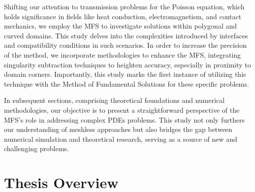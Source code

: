 Shifting our attention to transmission problems for the Poisson equation, which holds significance in fields like heat conduction, electromagnetism, and contact mechanics, we employ the \ac{MFS} to investigate solutions within polygonal and curved domains. This study delves into the complexities introduced by interfaces and compatibility conditions in such scenarios. In order to increase the precision of the method, we incorporate methodologies to enhance the \ac{MFS}, integrating singularity subtraction techniques to heighten accuracy, especially in proximity to domain corners. Importantly, this study marks the first instance of utilizing this technique with the Method of Fundamental Solutions for these specific problems.

In subsequent sections, comprising theoretical foundations and numerical methodologies, our objective is to present a straightforward perspective of the \ac{MFS}'s role in addressing complex \acp{PDE} problems. This study not only furthers our understanding of meshless approaches but also bridges the gap between numerical simulation and theoretical research, serving as a source of new and challenging problems.






\section{Thesis Overview}

